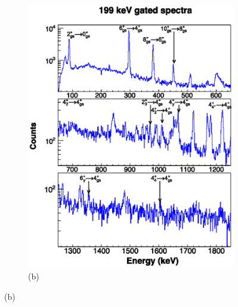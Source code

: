     \begin{figure}
    \ContinuedFloat
    \begin{subfigure}{\textwidth}
    \includegraphics[scale=1.3]{156GdTablesAndFigs/199_gamma.eps}
    \caption*{(b)}
    \label{fig:156_4to2spec}
    \end{subfigure}
    \end{figure}